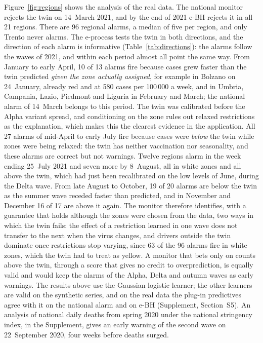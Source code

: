 Figure~\ref{fig:regions} shows the analysis of the real data. The national
monitor rejects the twin on 14~March 2021, and by the end of 2021 e-BH rejects
it in all 21 regions. There are 96 regional alarms, a median of five per
region, and only Trento never alarms. The e-process tests the twin in both
directions, and the direction of each alarm is informative
(Table~\ref{tab:directions}): the alarms follow the waves of 2021, and within
each period almost all point the same way. From January to early April, 10 of
13 alarms fire because cases grew faster than the twin predicted \emph{given
the zone actually assigned}, for example in Bolzano on 24~January, already red
and at 580 cases per 100\,000 a week, and in Umbria, Campania, Lazio, Piedmont
and Liguria in February and March; the national alarm of 14~March belongs to
this period. The twin was calibrated before the Alpha variant spread, and
conditioning on the zone rules out relaxed restrictions as the explanation,
which makes this the clearest evidence in the application. All 27 alarms of
mid-April to early July fire because cases were \emph{below} the twin while
zones were being relaxed: the twin has neither vaccination nor seasonality, and
these alarms are correct but not warnings. Twelve regions alarm in the week
ending 25~July 2021 and seven more by 8~August, all in white zones and all
above the twin, which had just been recalibrated on the low levels of June,
during the Delta wave. From late August to October, 19 of 20 alarms are below
the twin as the summer wave receded faster than predicted, and in November and
December 16 of 17 are above it again. The monitor therefore identifies, with a
guarantee that holds although the zones were chosen from the data, two ways in
which the twin fails: the effect of a restriction learned in one wave does not
transfer to the next when the virus changes, and drivers outside the twin
dominate once restrictions stop varying, since 63 of the 96 alarms fire in
white zones, which the twin had to treat as yellow. A monitor that bets only on
counts above the twin, through a score that gives no credit to
overprediction, is equally valid and would keep the alarms of the Alpha, Delta
and autumn waves as early warnings. The results above use the Gaussian logistic learner; the other learners are
valid on the synthetic series, and on the real data the plug-in predictives
agree with it on the national alarm and on e-BH (Supplement, Section~S5). An analysis of national daily
deaths from spring 2020 under the national stringency index, in the
Supplement, gives an
early warning of the second wave on 22~September 2020, four weeks before deaths
surged.

